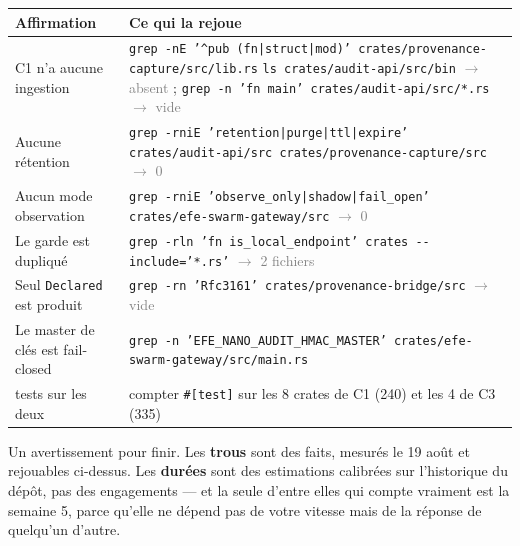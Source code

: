\documentclass[10pt]{article}
\newcommand{\sz}[1]{\textcolor{grey}{\small\textsf{#1}}}
\newcommand{\code}[1]{\texttt{\small #1}}
\newcommand{\fl}{$\rightarrow$}
\begin{document}
\renewcommand{\arraystretch}{1.22}
\begin{center}\small
\begin{tabular}{@{}>{\raggedright\arraybackslash}p{5.4cm} >{\raggedright\arraybackslash}p{10.6cm}@{}}
\toprule
\textbf{Affirmation} & \textbf{Ce qui la rejoue} \\
\midrule
C1 n'a aucune ingestion &
  \code{grep -nE '\textasciicircum pub (fn|struct|mod)' crates/provenance-capture/src/lib.rs} \newline
  \code{ls crates/audit-api/src/bin} \sz{\fl{} absent} \; ; \; \code{grep -n 'fn main' crates/audit-api/src/*.rs} \sz{\fl{} vide} \\
Aucune rétention &
  \code{grep -rniE 'retention|purge|ttl|expire' crates/audit-api/src crates/provenance-capture/src} \sz{\fl{} 0} \\
Aucun mode observation &
  \code{grep -rniE 'observe\_only|shadow|fail\_open' crates/efe-swarm-gateway/src} \sz{\fl{} 0} \\
Le garde est dupliqué &
  \code{grep -rln 'fn is\_local\_endpoint' crates -{}-include='*.rs'} \sz{\fl{} 2 fichiers} \\
Seul \code{Declared} est produit &
  \code{grep -rn 'Rfc3161' crates/provenance-bridge/src} \sz{\fl{} vide} \\
Le master de clés est fail-closed &
  \code{grep -n 'EFE\_NANO\_AUDIT\_HMAC\_MASTER' crates/efe-swarm-gateway/src/main.rs} \\
575 tests sur les deux &
  compter \code{\#[test]} sur les 8 crates de C1 (240) et les 4 de C3 (335) \\
\bottomrule
\end{tabular}
\end{center}

Un avertissement pour finir. Les \textbf{trous} sont des faits, mesurés le 19 août et rejouables
ci-dessus. Les \textbf{durées} sont des estimations calibrées sur l'historique du dépôt, pas des
engagements --- et la seule d'entre elles qui compte vraiment est la semaine 5, parce qu'elle ne
dépend pas de votre vitesse mais de la réponse de quelqu'un d'autre.
\end{document}
